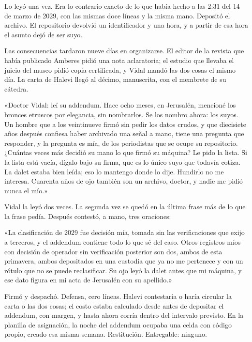 Lo leyó una vez. Era lo contrario exacto de lo que había hecho a las 2:31 del 14 de marzo de 2029, con las mismas doce líneas y la misma mano. Depositó el archivo. El repositorio devolvió un identificador y una hora, y a partir de esa hora el asunto dejó de ser suyo.

Las consecuencias tardaron nueve días en organizarse. El editor de la revista que había publicado Amberes pidió una nota aclaratoria; el estudio que llevaba el juicio del museo pidió copia certificada, y Vidal mandó las dos cosas el mismo día. La carta de Halevi llegó al décimo, manuscrita, con el membrete de su cátedra.

«Doctor Vidal: leí su addendum. Hace ocho meses, en Jerusalén, mencioné los bronces etruscos por elegancia, sin nombrarlos. Se los nombro ahora: los suyos. Un hombre que a los veintinueve firmó sin pedir los datos crudos, y que diecisiete años después confiesa haber archivado una señal a mano, tiene una pregunta que responder, y la pregunta es mía, de los periodistas que se ocupe su repositorio. ¿Cuántas veces más decidió su mano lo que firmó su máquina? Le pido la lista. Si la lista está vacía, dígalo bajo su firma, que es lo único suyo que todavía cotiza. La dalet estaba bien leída; eso lo mantengo donde lo dije. Hundirlo no me interesa. Cuarenta años de ojo también son un archivo, doctor, y nadie me pidió nunca el mío.»

Vidal la leyó dos veces. La segunda vez se quedó en la última frase más de lo que la frase pedía. Después contestó, a mano, tres oraciones:

«La clasificación de 2029 fue decisión mía, tomada sin las verificaciones que exijo a terceros, y el addendum contiene todo lo que sé del caso. Otros registros míos con decisión de operador sin verificación posterior son dos, ambos de esta primavera, ambos depositados en una custodia que ya no me pertenece y con un rótulo que no se puede reclasificar. Su ojo leyó la dalet antes que mi máquina, y ese dato figura en mi acta de Jerusalén con su apellido.»

Firmó y despachó. Defensa, cero líneas. Halevi contestaría o haría circular la carta o las dos cosas; el costo estaba calculado desde antes de depositar el addendum, con margen, y hasta ahora corría dentro del intervalo previsto. En la planilla de asignación, la noche del addendum ocupaba una celda con código propio, creado esa misma semana. Restitución. Entregable: ninguno.


\scenebreak


